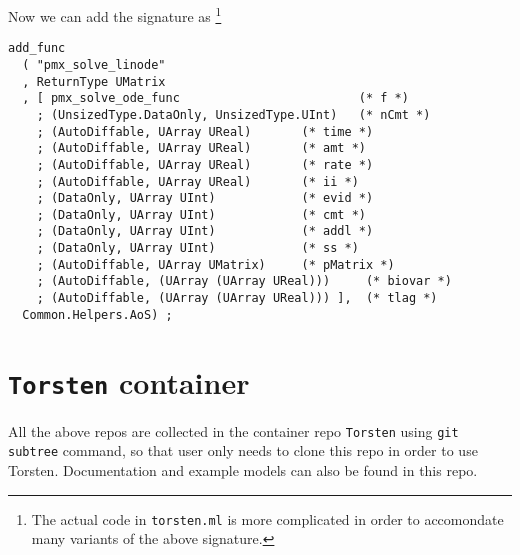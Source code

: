 \documentclass[12pt, reqno, oneside]{amsbook}
\numberwithin{equation}{chapter}
\numberwithin{figure}{chapter}
\numberwithin{table}{chapter}
\theoremstyle{remark}
\begin{document}
Now we can add the signature as \footnote{The actual code in \texttt{torsten.ml} is more complicated in order to
accomondate many variants of the above signature.}
\begin{verbatim}
add_func
  ( "pmx_solve_linode"
  , ReturnType UMatrix
  , [ pmx_solve_ode_func                         (* f *)
    ; (UnsizedType.DataOnly, UnsizedType.UInt)   (* nCmt *)
    ; (AutoDiffable, UArray UReal)       (* time *)
    ; (AutoDiffable, UArray UReal)       (* amt *)
    ; (AutoDiffable, UArray UReal)       (* rate *)
    ; (AutoDiffable, UArray UReal)       (* ii *)
    ; (DataOnly, UArray UInt)            (* evid *)
    ; (DataOnly, UArray UInt)            (* cmt *)
    ; (DataOnly, UArray UInt)            (* addl *)
    ; (DataOnly, UArray UInt)            (* ss *)
    ; (AutoDiffable, UArray UMatrix)     (* pMatrix *)
    ; (AutoDiffable, (UArray (UArray UReal)))     (* biovar *)
    ; (AutoDiffable, (UArray (UArray UReal))) ],  (* tlag *)
  Common.Helpers.AoS) ;
\end{verbatim}

\chapter{\texttt{Torsten} container}
\label{sec:orgc74dbe9}
All the above repos are collected in the container repo
\texttt{Torsten} using \texttt{git subtree} command, so that user only needs to
clone this repo in order to use Torsten. Documentation and example
models can also be found in this repo.
\end{document}
